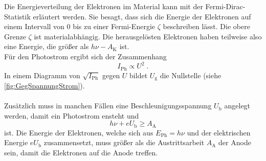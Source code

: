    \label{sec:theorie:fermi_dirac}
    Die Energieverteilung der Elektronen im Material kann mit der Fermi-Dirac-Statistik erläutert werden.
    Sie besagt, dass sich die Energie der Elektronen auf einem Intervall von 0 bis zu einer Fermi-Energie $\zeta$ beschreiben lässt.
    Die obere Grenze $\zeta$ ist materialabhängig.
    Die herausgelösten Elektronen haben teilweise also eine Energie, die größer als $h \nu - A_\text{K}$ ist.\\
    Für den Photostrom ergibt sich der Zusammenhang
    \begin{equation}
        \label{eqn:sqrt_I_gesetz}
        I_\text{Ph} \propto U^2 \; .
    \end{equation}
    In einem Diagramm von $\sqrt{I_\text{Ph}}$ gegen $U$ bildet $U_\text{g}$ die Nullstelle (siehe \autoref{fig:GegSpannungStrom}).\\
    \\
    Zusätzlich muss in manchen Fällen eine Beschleunigungsspannung $U_\text{b}$ angelegt werden,
    damit ein Photostrom ensteht und
    \begin{equation}
        h \nu + e U_\text{b} \geq A_\text{A}
    \end{equation}
    ist.
    Die Energie der Elektronen, welche sich aus $E_\text{Ph} =  h \nu$ und der elektrischen Energie $e U_\text{b}$ zusammensetzt,
    muss größer als die Austrittsarbeit $A_\text{A}$ der Anode sein,
    damit die Elektronen auf die Anode treffen.

